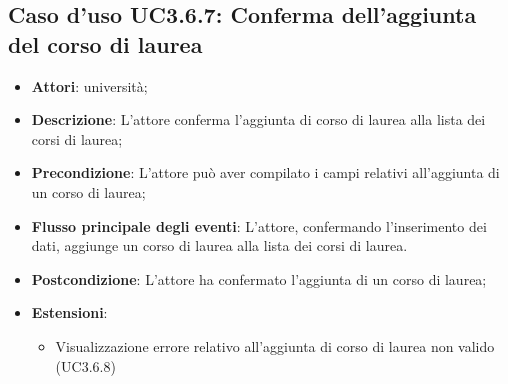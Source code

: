 \subsection{Caso d'uso \texorpdfstring{UC3.6.7}{UC3.6.7}: Conferma dell’aggiunta del corso di laurea}
\begin{itemize}
\item \textbf{Attori}: università;
\item \textbf{Descrizione}: L'attore conferma l'aggiunta di corso di laurea alla lista dei corsi di laurea;

\item \textbf{Precondizione}: L'attore può aver compilato i campi relativi all'aggiunta di un corso di laurea;

\item \textbf{Flusso principale degli eventi}: L'attore, confermando l'inserimento dei dati, aggiunge un corso di laurea alla lista dei corsi di laurea.

\item \textbf{Postcondizione}: L'attore ha confermato l'aggiunta di un corso di laurea;

\item \textbf{Estensioni}:
\begin{itemize}
\item Visualizzazione errore relativo all’aggiunta di corso di laurea non valido  (UC3.6.8)
\end{itemize}
\end{itemize}
